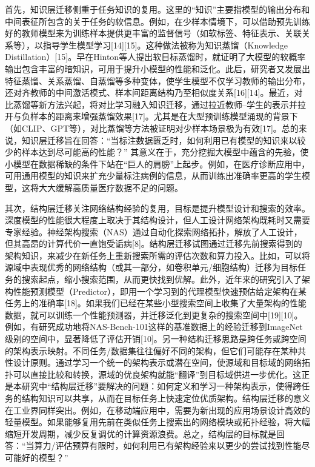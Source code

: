 首先，知识层迁移侧重于任务知识的复用。这里的“知识”主要指模型的输出分布和中间表征所包含的关于任务的软信息。例如，在少样本情境下，可以借助预先训练好的教师模型来为训练样本提供更丰富的监督信号（如软标签、特征表示、关联关系等），以指导学生模型学习[14][15]。这种做法被称为知识蒸馏（Knowledge Distillation）[15]。早在Hinton等人提出软目标蒸馏时，就证明了大模型的软概率输出包含丰富的暗知识，可用于提升小模型的性能和泛化。此后，研究者又发展出特征蒸馏、关系蒸馏、自蒸馏等多种变体，使学生模型不仅学习教师的输出分布，还对齐教师的中间激活模式、样本间距离结构乃至相似度关系[16][14]。最近，对比蒸馏等新方法兴起，将对比学习融入知识迁移，通过拉近教师–学生的表示并拉开与负样本的距离来增强蒸馏效果[17]。尤其是在大型预训练模型涌现的背景下（如CLIP、GPT等），对比蒸馏等方法被证明对少样本场景极为有效[17]。总的来说，知识层迁移旨在回答：“当标注数据匮乏时，如何利用已有模型的知识来以较少的样本达到尽可能高的性能？” 其意义在于，充分挖掘大模型中蕴含的先验，使小模型在数据稀缺的条件下站在“巨人的肩膀”上起步。例如，在医疗诊断应用中，可用通用模型的知识来扩充少量标注病例的信息，从而训练出准确率更高的学生模型，这将大大缓解高质量医疗数据不足的问题。

其次，结构层迁移关注网络结构经验的复用，目标是提升模型设计和搜索的效率。深度模型的性能很大程度上取决于其结构设计，但人工设计网络架构既耗时又需要专家经验。神经架构搜索（NAS）通过自动化探索网络拓扑，解放了人工设计，但其高昂的计算代价一直饱受诟病[8]。结构层迁移试图通过迁移先前搜索得到的架构知识，来减少在新任务上重新搜索所需的评估次数和算力投入。比如，可以将源域中表现优秀的网络结构（或其一部分，如卷积单元/细胞结构）迁移为目标任务的搜索起点，缩小搜索范围，从而更快找到优解。此外，近年来的研究引入了架构性能预测模型（Predictor），即用一个学习到的代理模型快速预估给定架构在某任务上的准确率[18]。如果我们已经在某些小型搜索空间上收集了大量架构的性能数据，就可以训练一个性能预测器，并迁移泛化到更复杂的搜索空间中[19][10]。例如，有研究成功地将NAS-Bench-101这样的基准数据上的经验迁移到ImageNet级别的空间中，显著降低了评估开销[10]。另一种结构迁移思路是跨任务或跨空间的架构表示映射。不同任务/数据集往往偏好不同的架构，但它们可能存在某种共性设计原则。通过学习一个统一的架构表示或潜在空间，使源域和目标域的网络拓扑可以直接比较和转换，源域的优良架构就能“翻译”到目标域供进一步优化。这正是本研究中“结构层迁移”要解决的问题：如何定义和学习一种架构表示，使得跨任务的结构知识可以共享，从而在目标任务上快速定位优质架构。结构层迁移的意义在工业界同样突出。例如，在移动端应用中，需要为新出现的应用场景设计高效的轻量模型。如果能够复用先前在类似任务上搜索出的网络模块或拓扑经验，将大幅缩短开发周期，减少反复调优的计算资源浪费。总之，结构层的目标就是回答：“当算力/评估预算有限时，如何利用已有架构经验来以更少的尝试找到性能尽可能好的模型？”


